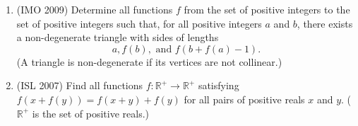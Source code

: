 \documentclass[11pt]{article}
\begin{document}
\begin{enumerate}
  \item (IMO 2009) Determine all functions $ f$ from the set of positive integers to the set of positive integers such that, for all positive integers $ a$ and $ b$, there exists a non-degenerate triangle with sides of lengths 
  \[ a, f(b), \text{ and } f(b + f(a) - 1). \]
  (A triangle is non-degenerate if its vertices are not collinear.) 
  
  \item (ISL 2007) Find all functions $f : \mathbb{R}^+ \to \mathbb{R}^+$ satisfying $f(x+f(y)) = f(x+y) + f(y)$ for all pairs of positive reals $x$ and $y$. ($\mathbb{R}^+$ is the set of positive reals.)
\end{enumerate} 
 
\end{document}
